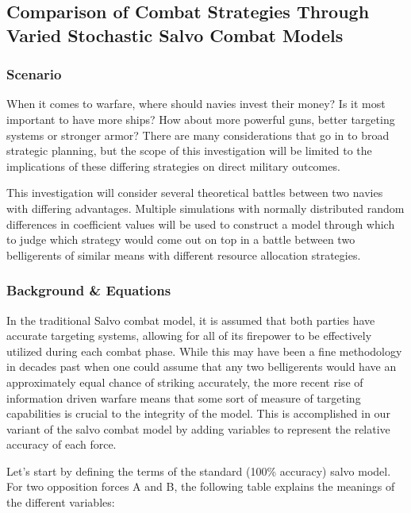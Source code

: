 \hypertarget{comparison-of-combat-strategies-through-varied-stochastic-salvo-combat-models}{%
\subsection{Comparison of Combat Strategies Through Varied Stochastic
Salvo Combat
Models}\label{comparison-of-combat-strategies-through-varied-stochastic-salvo-combat-models}}

\hypertarget{scenario}{%
\subsubsection{Scenario}\label{scenario}}

When it comes to warfare, where should navies invest their money? Is it
most important to have more ships? How about more powerful guns, better
targeting systems or stronger armor? There are many considerations that
go in to broad strategic planning, but the scope of this investigation
will be limited to the implications of these differing strategies on
direct military outcomes.

This investigation will consider several theoretical battles between two
navies with differing advantages. Multiple simulations with normally
distributed random differences in coefficient values will be used to
construct a model through which to judge which strategy would come out
on top in a battle between two belligerents of similar means with
different resource allocation strategies.

\hypertarget{background-equations}{%
\subsubsection{Background \& Equations}\label{background-equations}}

In the traditional Salvo combat model, it is assumed that both parties
have accurate targeting systems, allowing for all of its firepower to be
effectively utilized during each combat phase. While this may have been
a fine methodology in decades past when one could assume that any two
belligerents would have an approximately equal chance of striking
accurately, the more recent rise of information driven warfare means
that some sort of measure of targeting capabilities is crucial to the
integrity of the model. This is accomplished in our variant of the salvo
combat model by adding variables to represent the relative accuracy of
each force.

Let's start by defining the terms of the standard (100\% accuracy) salvo
model. For two opposition forces A and B, the following table explains
the meanings of the different variables:

